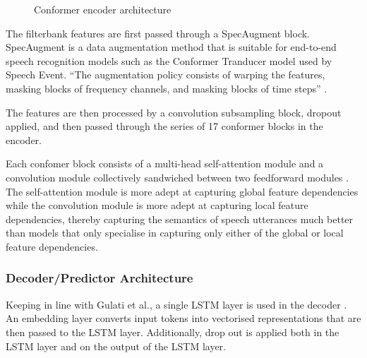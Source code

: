 \documentclass{CSSRforAfrica}
\begin{document}
\begin{figure}[thb]
\begin{center}
\end{center}
\caption{Conformer encoder architecture \cite{gulati_conformer_2020}}
\label{fig:conformer-encoder}
\end{figure}

The filterbank features are first passed through a SpecAugment block. SpecAugment is a data augmentation method that is suitable for end-to-end speech recognition models such as the Conformer Tranducer model used by Speech Event. ``The augmentation policy consists of warping the features, masking blocks of frequency channels, and masking blocks of time steps'' \cite{park_specaugment_2019}.

The features are then processed by a convolution subsampling block, dropout applied, and then passed through the series of 17 conformer blocks in the encoder.

Each confomer block consists of a multi-head self-attention module and a convolution module collectively sandwiched between two feedforward modules \cite{gulati_conformer_2020}. The self-attention module is more adept at capturing global feature dependencies while the convolution module is more adept at capturing local feature dependencies, thereby capturing the semantics of speech utterances much better than models that only specialise in capturing only either of the global or local feature dependencies.

\subsubsection{Decoder/Predictor Architecture}
Keeping in line with Gulati et al., a single LSTM layer is used in the decoder \cite{gulati_conformer_2020}. An embedding layer converts input tokens into vectorised representations that are then passed to the LSTM layer. Additionally, drop out is applied both in the LSTM layer and on the output of the LSTM layer.
\end{document}
